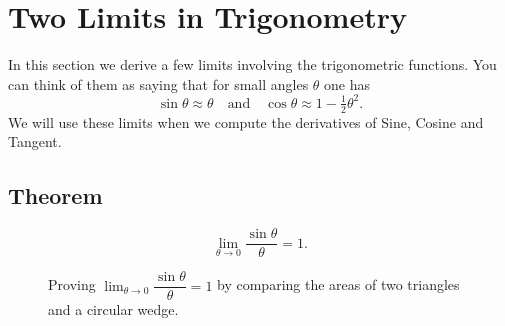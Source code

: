 \noproblemfont
\section{Two Limits in Trigonometry} 
\label{sec:trigLimit}

In this section we derive a few limits involving the trigonometric
functions.  You can think of them as saying that for small angles $\theta$
one has
\begin{equation}
  \sin\theta \approx \theta\quad\text{and}\quad \cos\theta\approx 1-\tfrac12
  \theta^2.
  \label{eq:03sine-theta-is-roughly-theta}
\end{equation}
We will use these limits when we compute the derivatives of Sine, Cosine
and Tangent.

\subsection*{Theorem}%
\begin{equation}
  \lim_{\theta\to 0}\frac{\sin\theta}{\theta} = 1 .
  \label{eq:03trig-limit}
\end{equation}

\begin{figure}[t]
  \caption{Proving $\lim_{\theta\to 0} \dfrac{\sin \theta}{\theta}
    = 1$ by comparing the areas of two triangles and a circular wedge. }
  \label{fig:sintheta-almost-theta}
\end{figure}

